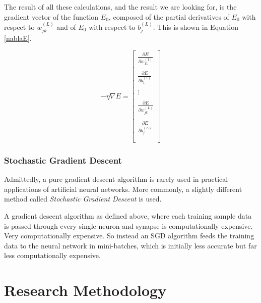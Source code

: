\documentclass[12pt]{article}
\begin{document}
        The result of all these calculations, and the result we are looking for, is the gradient vector of the function $E_0$, composed of the partial derivatives of $E_0$ with respect to $w_{jk}^{(L)}$ and of $E_0$ with respect to $b_j^{(L)}$. This is shown in Equation \ref{nablaE}.


        \begin{equation} \label{nablaE}
            -\eta \nabla E = \begin{bmatrix}
                \frac{\partial E}{\partial w_{11}^{(1)}} \\\\
                \frac{\partial E}{\partial b_1^{(1)}} \\\\
                \vdots \\\\
                \frac{\partial E}{\partial w_{jk}^{(L)}} \\\\
                \frac{\partial E}{\partial b_j^{(L)}} \\\\
            \end{bmatrix}
        \end{equation}

        \subsubsection{Stochastic Gradient Descent}

            Admittedly, a pure gradient descent algorithm is rarely used in practical applications of artificial neural networks. More commonly, a slightly different method called \textit{Stochastic Gradient Descent} is used. 

            A gradient descent algorithm as defined above, where each training sample data is passed through every single neuron and synapse is computationally expensive. Very computationally expensive. So instead an SGD algorithm feeds the training data to the neural network in mini-batches, which is initially less accurate but far less computationally expensive.

\section{Research Methodology \label{methodology}}

\end{document}

